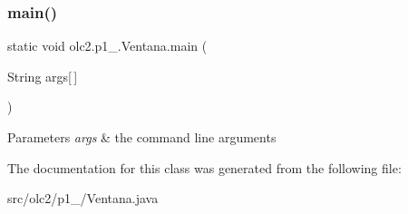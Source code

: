 \subsubsection{\texorpdfstring{main()}{main()}}
{\footnotesize\ttfamily static void olc2.\+p1\+\_.\+Ventana.\+main (\begin{DoxyParamCaption}\item[{String}]{args\mbox{[}$\,$\mbox{]} }\end{DoxyParamCaption})\hspace{0.3cm}{\ttfamily [static]}}


\begin{DoxyParams}{Parameters}
{\em args} & the command line arguments \\
\hline
\end{DoxyParams}


The documentation for this class was generated from the following file\+:\begin{DoxyCompactItemize}
\item 
src/olc2/p1\+\_/Ventana.\+java\end{DoxyCompactItemize}

